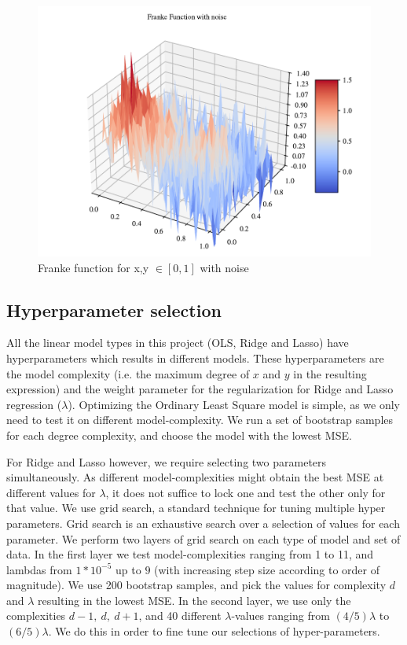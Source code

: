 \begin{figure}[h!]
\centering
\includegraphics[width=1\linewidth]{project_1_alt/figures/data/franke_func_noise.pdf}
\caption{Franke function for x,y $\in [0,1]$ with noise }
\label{franke_noise}
\end{figure}




\subsection{Hyperparameter selection}
All the linear model types in this project (OLS, Ridge and Lasso) have hyperparameters which results in different models. 
These hyperparameters are the model complexity (i.e. the maximum degree of $x$ and $y$ in the resulting expression) and the weight parameter for the regularization for Ridge and Lasso regression ($\lambda$). 
Optimizing the Ordinary Least Square model is simple, as we only need to test it on different model-complexity. 
We run a set of bootstrap samples for each degree complexity, and choose the model with the lowest MSE.

For Ridge and Lasso however, we require selecting two parameters simultaneously. As different model-complexities might obtain the best MSE at different values for $\lambda$, it does not suffice to lock one and test the other only for that value. 
We use grid search, a standard technique for tuning multiple hyper parameters. \cite{grid_search} 
Grid search is an exhaustive search over a selection of values for each parameter. 
We perform two layers of grid search on each type of model and set of data. 
In the first layer we test model-complexities ranging from 1 to 11, and lambdas from $1*10^{-5}$ up to $9$ (with increasing step size according to order of magnitude). 
We use 200 bootstrap samples, and pick the values for complexity $d$ and $\lambda$ resulting in the lowest MSE. 
In the second layer, we use only the complexities $d-1,\ d,\ d+1$, and 40 different $\lambda$-values ranging from $(4/5)\lambda$ to $(6/5)\lambda$. 
We do this in order to fine tune our selections of hyper-parameters.
\gaute{}